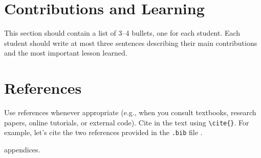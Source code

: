 \documentclass[12pt]{article}
\begin{document}
\section{Contributions and Learning}



This section should contain a list of 3–4 bullets, one for each student. Each
student should write at most three sentences describing their main contributions
and the most important lesson learned.



\section{References}
Use references whenever appropriate (e.g., when you consult textbooks, research
papers, online tutorials, or external code). Cite in the text using \verb|\cite{}|.
For example, let's cite the two references provided in the \texttt{.bib} file
\cite{bishop2006prml,hastie2009esl}.


\newpage
\appendix
appendices.
\end{document}
